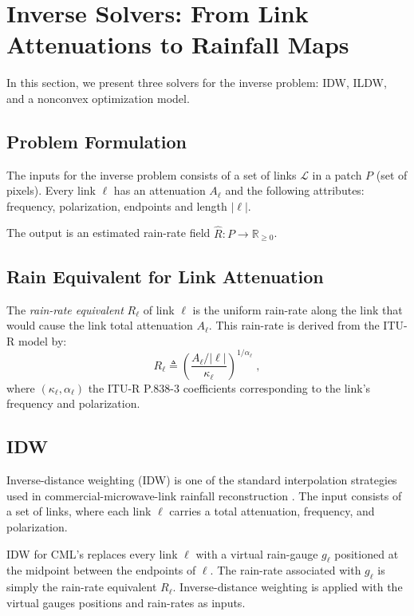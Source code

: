\documentclass[a4paper,fleqn]{cas-sc}
\newcommand{\notebox}[3]{%
  \begingroup
  \setlength{\fboxsep}{2pt}%
  \fcolorbox{#1}{#2}{\textsf{\footnotesize #3}}%
  \endgroup
}
\DeclareRobustCommand{\editnote}[1]{%
  \texorpdfstring{%
    \nobreak\hfill
    \mbox{\notebox{red!50!black}{red!10}{#1}}%
  }{}%
}
\begin{document}
\section{Inverse Solvers: From Link Attenuations to Rainfall Maps\editnote{GE:stable}}
In this section, we present three solvers for the inverse problem: IDW, ILDW, and a nonconvex optimization model.

\subsection{Problem Formulation}
The inputs for the inverse problem consists of a set of links $\mathcal{L}$ in a patch $P$ (set of pixels). Every link $\ell$ has an attenuation $A_{\ell}$ and the following attributes: frequency, polarization, endpoints and length $|\ell|$.

The output is an estimated rain-rate field $\hat{R}:P\rightarrow \mathbb{R}_{\geq 0}$.

\subsection{Rain Equivalent for Link Attenuation}\label{sec:rain rate equivalent}
The \emph{rain-rate equivalent} $R_{\ell}$ of link $\ell$ is the uniform rain-rate along the link that would cause the link total attenuation $A_\ell$. This rain-rate is derived from the ITU-R model by:
\[
  R_\ell \triangleq \left(\frac{A_\ell/|\ell|}{\kappa_\ell}\right)^{1/\alpha_\ell}\;,
\]
where $(\kappa_\ell,\alpha_\ell)$ the ITU-R P.838-3 coefficients corresponding to the link's frequency and polarization.

\subsection{IDW}
Inverse-distance weighting (IDW) is one of the standard interpolation strategies used in commercial-microwave-link rainfall reconstruction
\citep{zimmerman1999experimental,jin2003comparison_krigbetter,chen2012estimation_idwforrain,chwala2019cml,eshel2020idw,eshel2021quantitative}.
The input consists of a set of links, where each link $\ell$ carries a total attenuation, frequency, and polarization.

IDW for CML's replaces every link $\ell$ with a virtual rain-gauge $g_{\ell}$ positioned at the midpoint between the endpoints of $\ell$. The rain-rate associated with $g_{\ell}$ is simply the rain-rate equivalent $R_{\ell}$. Inverse-distance weighting is applied with the virtual gauges positions and rain-rates as inputs.
\end{document}
